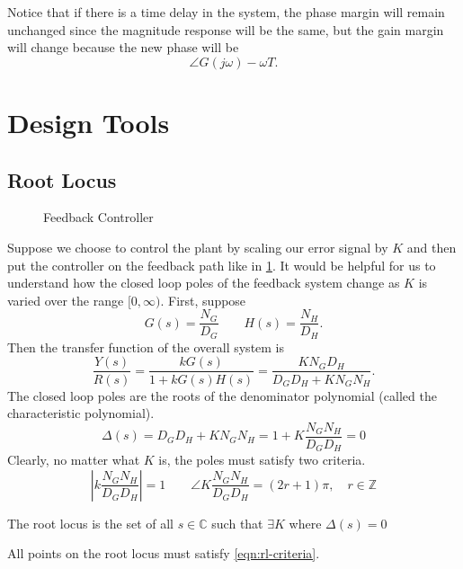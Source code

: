 Notice that if there is a time delay in the system, the phase margin will remain unchanged since the magnitude response will be the same, but the gain margin will change because the new phase will be
\[
  \angle G(j\omega) - \omega T.
\]
\section{Design Tools}
\subsection{Root Locus}
\begin{figure}[H]
    \centering 
    \caption{Feedback Controller}
    \label{fig:rl-feedback-controller}
\end{figure}
Suppose we choose to control the plant by scaling our error signal by $K$ and then put the controller on the feedback path like in \cref{fig:rl-feedback-controller}.
It would be helpful for us to understand how the closed loop poles of the feedback system change as $K$ is varied over the range $[0, \infty)$.
First, suppose
\[
  G(s) = \frac{N_G}{D_G} \qquad H(s) = \frac{N_H}{D_H}.
\]
Then the transfer function of the overall system is
\[
  \frac{Y(s)}{R(s)} = \frac{kG(s)}{1+kG(s)H(s)} = \frac{KN_GD_H}{D_GD_H+KN_GN_H}.
\]
The closed loop poles are the roots of the denominator polynomial (called the characteristic polynomial).
\begin{equation}
  \Delta(s) = D_GD_H+KN_GN_H = 1 + K\frac{N_GN_H}{D_GD_H} = 0
  \label{eqn:rl-character-poly}
\end{equation}
Clearly, no matter what $K$ is, the poles must satisfy two criteria.
\begin{equation}
  \left|k\frac{N_GN_H}{D_GD_H}\right| = 1 \qquad \angle K\frac{N_GN_H}{D_GD_H} = (2r+1)\pi,\quad r\in\mathbb{Z}
  \label{eqn:rl-criteria}
\end{equation}
\begin{definition}
  The root locus is the set of all $s\in\mathbb{C}$ such that $\exists K$ where $\Delta(s) = 0$
  \label{defn:root-locus}
\end{definition}
All points on the root locus must satisfy \cref{eqn:rl-criteria}.
